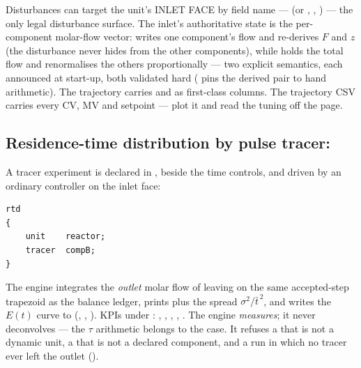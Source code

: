 \documentclass[11pt,a4paper]{article}
\begin{document}
Disturbances can target the unit's INLET FACE by field name ---
 (or ,
, ) --- the only
legal disturbance surface.  The inlet's authoritative state is the
per-component molar-flow vector:  writes
one component's flow and re-derives $F$ and $z$ (the disturbance never
hides from the other components), while  holds
the total flow and renormalises the others proportionally --- two
explicit semantics, each announced at start-up, both validated hard
( pins the derived pair to hand
arithmetic).  The trajectory carries  and 
as first-class columns.
The trajectory CSV carries every CV, MV and setpoint --- plot it and
read the tuning off the page.

\subsection{Residence-time distribution by pulse tracer: }\label{sec:ctrl-rtd}

A tracer experiment is declared in , beside the time
controls, and driven by an ordinary  controller on the
inlet face:

\begin{lstlisting}[language=dict]
rtd
{
    unit    reactor;
    tracer  compB;
}
\end{lstlisting}

The engine integrates the \emph{outlet} molar flow of 
leaving  on the same accepted-step trapezoid as the balance
ledger, prints  plus the spread
$\sigma^2/\bar t^{\,2}$, and writes the $E(t)$ curve to
 (, ,
).  KPIs under : ,
, , ,
.  The engine \emph{measures}; it
never deconvolves --- the $\tau$ arithmetic belongs to the case.  It refuses a  that is not a
dynamic unit, a  that is not a declared component, and a
run in which no tracer ever left the outlet
().
\end{document}
